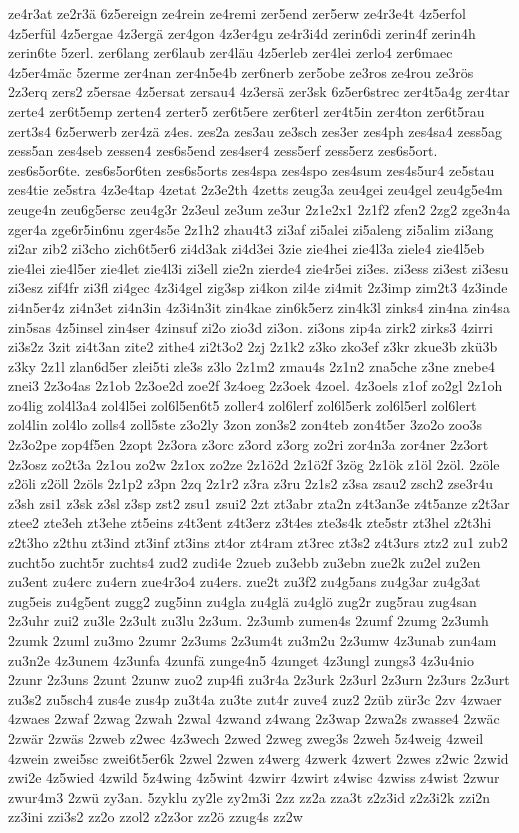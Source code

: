 {ze4r3at
ze2r3ä
6z5ereign
ze4rein
ze4remi
zer5end
zer5erw
ze4r3e4t
4z5erfol
4z5erfül
4z5ergae
4z3ergä
zer4gon
4z3er4gu
ze4r3i4d
zerin6di
zerin4f
zerin4h
zerin6te
5zerl.
zer6lang
zer6laub
zer4läu
4z5erleb
zer4lei
zerlo4
zer6maec
4z5er4mäc
5zerme
zer4nan
zer4n5e4b
zer6nerb
zer5obe
ze3ros
ze4rou
ze3rös
2z3erq
zers2
z5ersae
4z5ersat
zersau4
4z3ersä
zer3sk
6z5er6strec
zer4t5a4g
zer4tar
zerte4
zer6t5emp
zerten4
zerter5
zer6t5ere
zer6terl
zer4t5in
zer4ton
zer6t5rau
zert3s4
6z5erwerb
zer4zä
z4es.
zes2a
zes3au
ze3sch
zes3er
zes4ph
zes4sa4
zess5ag
zess5an
zes4seb
zessen4
zes6s5end
zes4ser4
zess5erf
zess5erz
zes6s5ort.
zes6s5or6te.
zes6s5or6ten
zes6s5orts
zes4spa
zes4spo
zes4sum
zes4s5ur4
ze5stau
zes4tie
ze5stra
4z3e4tap
4zetat
2z3e2th
4zetts
zeug3a
zeu4gei
zeu4gel
zeu4g5e4m
zeuge4n
zeu6g5ersc
zeu4g3r
2z3eul
ze3um
ze3ur
2z1e2x1
2z1f2
zfen2
2zg2
zge3n4a
zger4a
zge6r5in6nu
zger4s5e
2z1h2
zhau4t3
zi3af
zi5alei
zi5aleng
zi5alim
zi3ang
zi2ar
zib2
zi3cho
zich6t5er6
zi4d3ak
zi4d3ei
3zie
zie4hei
zie4l3a
ziele4
zie4l5eb
zie4lei
zie4l5er
zie4let
zie4l3i
zi3ell
zie2n
zierde4
zie4r5ei
zi3es.
zi3ess
zi3est
zi3esu
zi3esz
zif4fr
zi3fl
zi4gec
4z3i4gel
zig3sp
zi4kon
zil4e
zi4mit
2z3imp
zim2t3
4z3inde
zi4n5er4z
zi4n3et
zi4n3in
4z3i4n3it
zin4kae
zin6k5erz
zin4k3l
zinks4
zin4na
zin4sa
zin5sas
4z5insel
zin4ser
4zinsuf
zi2o
zio3d
zi3on.
zi3ons
zip4a
zirk2
zirks3
4zirri
zi3s2z
3zit
zi4t3an
zite2
zithe4
zi2t3o2
2zj
2z1k2
z3ko
zko3ef
z3kr
zkue3b
zkü3b
z3ky
2z1l
zlan6d5er
zlei5ti
zle3s
z3lo
2z1m2
zmau4s
2z1n2
zna5che
z3ne
znebe4
znei3
2z3o4as
2z1ob
2z3oe2d
zoe2f
3z4oeg
2z3oek
4zoel.
4z3oels
z1of
zo2gl
2z1oh
zo4lig
zol4l3a4
zol4l5ei
zol6l5en6t5
zoller4
zol6lerf
zol6l5erk
zol6l5erl
zol6lert
zol4lin
zol4lo
zolls4
zoll5ste
z3o2ly
3zon
zon3s2
zon4teb
zon4t5er
3zo2o
zoo3s
2z3o2pe
zop4f5en
2zopt
2z3ora
z3orc
z3ord
z3org
zo2ri
zor4n3a
zor4ner
2z3ort
2z3osz
zo2t3a
2z1ou
zo2w
2z1ox
zo2ze
2z1ö2d
2z1ö2f
3zög
2z1ök
z1öl
2zöl.
2zöle
z2öli
z2öll
2zöls
2z1p2
z3pn
2zq
2z1r2
z3ra
z3ru
2z1s2
z3sa
zsau2
zsch2
zse3r4u
z3sh
zsi1
z3sk
z3sl
z3sp
zst2
zsu1
zsui2
2zt
zt3abr
zta2n
z4t3an3e
z4t5anze
z2t3ar
ztee2
zte3eh
zt3ehe
zt5eins
z4t3ent
z4t3erz
z3t4es
zte3s4k
zte5str
zt3hel
z2t3hi
z2t3ho
z2thu
zt3ind
zt3inf
zt3ins
zt4or
zt4ram
zt3rec
zt3s2
z4t3urs
ztz2
zu1
zub2
zucht5o
zucht5r
zuchts4
zud2
zudi4e
2zueb
zu3ebb
zu3ebn
zue2k
zu2el
zu2en
zu3ent
zu4erc
zu4ern
zue4r3o4
zu4ers.
zue2t
zu3f2
zu4g5ans
zu4g3ar
zu4g3at
zug5eis
zu4g5ent
zugg2
zug5inn
zu4gla
zu4glä
zu4glö
zug2r
zug5rau
zug4san
2z3uhr
zui2
zu3le
2z3ult
zu3lu
2z3um.
2z3umb
zumen4s
2zumf
2zumg
2z3umh
2zumk
2zuml
zu3mo
2zumr
2z3ums
2z3um4t
zu3m2u
2z3umw
4z3unab
zun4am
zu3n2e
4z3unem
4z3unfa
4zunfä
zunge4n5
4zunget
4z3ungl
zungs3
4z3u4nio
2zunr
2z3uns
2zunt
2zunw
zuo2
zup4fi
zu3r4a
2z3urk
2z3url
2z3urn
2z3urs
2z3urt
zu3s2
zu5sch4
zus4e
zus4p
zu3t4a
zu3te
zut4r
zuve4
zuz2
2züb
zür3c
2zv
4zwaer
4zwaes
2zwaf
2zwag
2zwah
2zwal
4zwand
z4wang
2z3wap
2zwa2s
zwasse4
2zwäc
2zwär
2zwäs
2zweb
z2wec
4z3wech
2zwed
2zweg
zweg3s
2zweh
5z4weig
4zweil
4zwein
zwei5sc
zwei6t5er6k
2zwel
2zwen
z4werg
4zwerk
4zwert
2zwes
z2wic
2zwid
zwi2e
4z5wied
4zwild
5z4wing
4z5wint
4zwirr
4zwirt
z4wisc
4zwiss
z4wist
2zwur
zwur4m3
2zwü
zy3an.
5zyklu
zy2le
zy2m3i
2zz
zz2a
zza3t
z2z3id
z2z3i2k
zzi2n
zz3ini
zzi3s2
zz2o
zzol2
z2z3or
zz2ö
zzug4s
zz2w
}

\endinput

